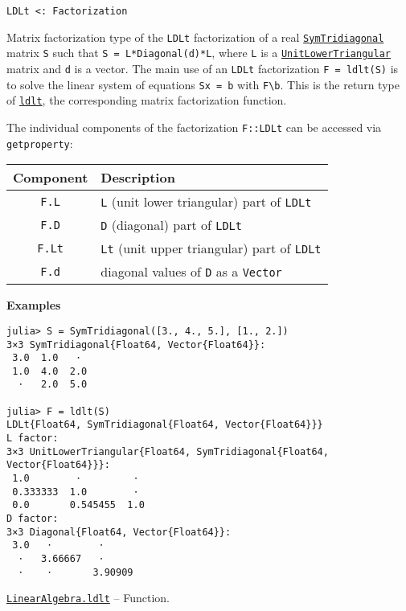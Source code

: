 \begin{adjustwidth}{2em}{0pt}


\begin{verbatim}
LDLt <: Factorization
\end{verbatim}

Matrix factorization type of the \texttt{LDLt} factorization of a real \hyperlink{6062797780727203318}{\texttt{SymTridiagonal}} matrix \texttt{S} such that \texttt{S = L*Diagonal(d)*L{\textquotesingle}}, where \texttt{L} is a \hyperlink{2163321084999097240}{\texttt{UnitLowerTriangular}} matrix and \texttt{d} is a vector. The main use of an \texttt{LDLt} factorization \texttt{F = ldlt(S)} is to solve the linear system of equations \texttt{Sx = b} with \texttt{F{\textbackslash}b}. This is the return type of \hyperlink{8934377864822491393}{\texttt{ldlt}}, the corresponding matrix factorization function.

The individual components of the factorization \texttt{F::LDLt} can be accessed via \texttt{getproperty}:


\begin{table}[h]

\begin{tabulary}{\linewidth}{|C|L|}
\hline
Component & Description \\
\hline
\texttt{F.L} & \texttt{L} (unit lower triangular) part of \texttt{LDLt} \\
\hline
\texttt{F.D} & \texttt{D} (diagonal) part of \texttt{LDLt} \\
\hline
\texttt{F.Lt} & \texttt{Lt} (unit upper triangular) part of \texttt{LDLt} \\
\hline
\texttt{F.d} & diagonal values of \texttt{D} as a \texttt{Vector} \\
\hline
\end{tabulary}

\end{table}

\textbf{Examples}


\begin{verbatim}
julia> S = SymTridiagonal([3., 4., 5.], [1., 2.])
3×3 SymTridiagonal{Float64, Vector{Float64}}:
 3.0  1.0   ⋅
 1.0  4.0  2.0
  ⋅   2.0  5.0

julia> F = ldlt(S)
LDLt{Float64, SymTridiagonal{Float64, Vector{Float64}}}
L factor:
3×3 UnitLowerTriangular{Float64, SymTridiagonal{Float64, Vector{Float64}}}:
 1.0        ⋅         ⋅
 0.333333  1.0        ⋅
 0.0       0.545455  1.0
D factor:
3×3 Diagonal{Float64, Vector{Float64}}:
 3.0   ⋅        ⋅
  ⋅   3.66667   ⋅
  ⋅    ⋅       3.90909
\end{verbatim}



\end{adjustwidth}
\hypertarget{8934377864822491393}{}
\hyperlink{8934377864822491393}{\texttt{LinearAlgebra.ldlt}}  -- {Function.}

